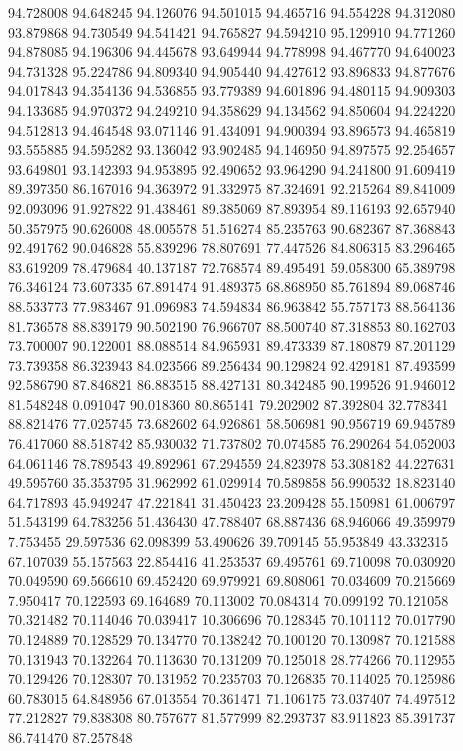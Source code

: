 94.728008
94.648245
94.126076
94.501015
94.465716
94.554228
94.312080
93.879868
94.730549
94.541421
94.765827
94.594210
95.129910
94.771260
94.878085
94.196306
94.445678
93.649944
94.778998
94.467770
94.640023
94.731328
95.224786
94.809340
94.905440
94.427612
93.896833
94.877676
94.017843
94.354136
94.536855
93.779389
94.601896
94.480115
94.909303
94.133685
94.970372
94.249210
94.358629
94.134562
94.850604
94.224220
94.512813
94.464548
93.071146
91.434091
94.900394
93.896573
94.465819
93.555885
94.595282
93.136042
93.902485
94.146950
94.897575
92.254657
93.649801
93.142393
94.953895
92.490652
93.964290
94.241800
91.609419
89.397350
86.167016
94.363972
91.332975
87.324691
92.215264
89.841009
92.093096
91.927822
91.438461
89.385069
87.893954
89.116193
92.657940
50.357975
90.626008
48.005578
51.516274
85.235763
90.682367
87.368843
92.491762
90.046828
55.839296
78.807691
77.447526
84.806315
83.296465
83.619209
78.479684
40.137187
72.768574
89.495491
59.058300
65.389798
76.346124
73.607335
67.891474
91.489375
68.868950
85.761894
89.068746
88.533773
77.983467
91.096983
74.594834
86.963842
55.757173
88.564136
81.736578
88.839179
90.502190
76.966707
88.500740
87.318853
80.162703
73.700007
90.122001
88.088514
84.965931
89.473339
87.180879
87.201129
73.739358
86.323943
84.023566
89.256434
90.129824
92.429181
87.493599
92.586790
87.846821
86.883515
88.427131
80.342485
90.199526
91.946012
81.548248
0.091047
90.018360
80.865141
79.202902
87.392804
32.778341
88.821476
77.025745
73.682602
64.926861
58.506981
90.956719
69.945789
76.417060
88.518742
85.930032
71.737802
70.074585
76.290264
54.052003
64.061146
78.789543
49.892961
67.294559
24.823978
53.308182
44.227631
49.595760
35.353795
31.962992
61.029914
70.589858
56.990532
18.823140
64.717893
45.949247
47.221841
31.450423
23.209428
55.150981
61.006797
51.543199
64.783256
51.436430
47.788407
68.887436
68.946066
49.359979
7.753455
29.597536
62.098399
53.490626
39.709145
55.953849
43.332315
67.107039
55.157563
22.854416
41.253537
69.495761
69.710098
70.030920
70.049590
69.566610
69.452420
69.979921
69.808061
70.034609
70.215669
7.950417
70.122593
69.164689
70.113002
70.084314
70.099192
70.121058
70.321482
70.114046
70.039417
10.306696
70.128345
70.101112
70.017790
70.124889
70.128529
70.134770
70.138242
70.100120
70.130987
70.121588
70.131943
70.132264
70.113630
70.131209
70.125018
28.774266
70.112955
70.129426
70.128307
70.131952
70.235703
70.126835
70.114025
70.125986
60.783015
64.848956
67.013554
70.361471
71.106175
73.037407
74.497512
77.212827
79.838308
80.757677
81.577999
82.293737
83.911823
85.391737
86.741470
87.257848
